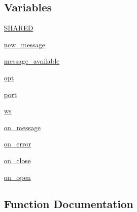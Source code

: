 \subsection*{Variables}
\begin{DoxyCompactItemize}
\item 
\hyperlink{namespaceparlai_1_1chat__service_1_1services_1_1browser__chat_1_1client_a2de929f83e3e760831d2e92d8b52a74e}{S\+H\+A\+R\+ED}
\item 
\hyperlink{namespaceparlai_1_1chat__service_1_1services_1_1browser__chat_1_1client_af28a15c026ebd618405d3903d810dc44}{new\+\_\+message}
\item 
\hyperlink{namespaceparlai_1_1chat__service_1_1services_1_1browser__chat_1_1client_a178b21adf088ad32a29bbfd4e4e6ff27}{message\+\_\+available}
\item 
\hyperlink{namespaceparlai_1_1chat__service_1_1services_1_1browser__chat_1_1client_a92a5f256bcea98234b98d32c25aa253e}{opt}
\item 
\hyperlink{namespaceparlai_1_1chat__service_1_1services_1_1browser__chat_1_1client_a46a116f8497201cc4beffe2957ef1ced}{port}
\item 
\hyperlink{namespaceparlai_1_1chat__service_1_1services_1_1browser__chat_1_1client_a8fdfc8439baf6777a9c010e2b553fbf0}{ws}
\item 
\hyperlink{namespaceparlai_1_1chat__service_1_1services_1_1browser__chat_1_1client_a01c1536b48e2f5badd2fe58ea02b9a5c}{on\+\_\+message}
\item 
\hyperlink{namespaceparlai_1_1chat__service_1_1services_1_1browser__chat_1_1client_a612c6202111e83b32c4b7cb51959f06d}{on\+\_\+error}
\item 
\hyperlink{namespaceparlai_1_1chat__service_1_1services_1_1browser__chat_1_1client_add94040308bad4454cbcf4c8010d0c51}{on\+\_\+close}
\item 
\hyperlink{namespaceparlai_1_1chat__service_1_1services_1_1browser__chat_1_1client_af1dac9dd18b0540ef7cedbd744638dd3}{on\+\_\+open}
\end{DoxyCompactItemize}


\subsection{Function Documentation}
\mbox{\label{namespaceparlai_1_1chat__service_1_1services_1_1browser__chat_1_1client_a9dc3b2493e22a73e05cc2c1220b75ca3}} 
